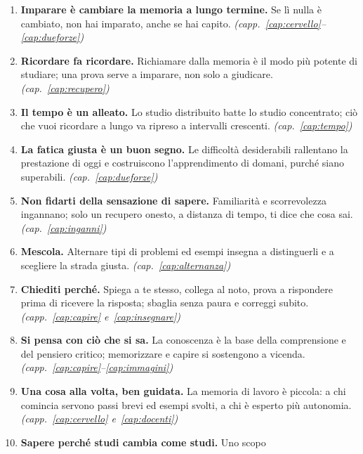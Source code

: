 \begin{enumerate}[leftmargin=1.8em, itemsep=0.35\baselineskip]
  \item \textbf{Imparare è cambiare la memoria a lungo termine.} Se lì
        nulla è cambiato, non hai imparato, anche se hai capito.
        {\footnotesize\itshape (capp.~\ref{cap:cervello}--\ref{cap:dueforze})}
  \item \textbf{Ricordare fa ricordare.} Richiamare dalla memoria è il
        modo più potente di studiare; una prova serve a imparare, non
        solo a giudicare.
        {\footnotesize\itshape (cap.~\ref{cap:recupero})}
  \item \textbf{Il tempo è un alleato.} Lo studio distribuito batte lo
        studio concentrato; ciò che vuoi ricordare a lungo va ripreso a
        intervalli crescenti.
        {\footnotesize\itshape (cap.~\ref{cap:tempo})}
  \item \textbf{La fatica giusta è un buon segno.} Le difficoltà
        desiderabili rallentano la prestazione di oggi e costruiscono
        l'apprendimento di domani, purché siano superabili.
        {\footnotesize\itshape (cap.~\ref{cap:dueforze})}
  \item \textbf{Non fidarti della sensazione di sapere.} Familiarità e
        scorrevolezza ingannano; solo un recupero onesto, a distanza di
        tempo, ti dice che cosa sai.
        {\footnotesize\itshape (cap.~\ref{cap:inganni})}
  \item \textbf{Mescola.} Alternare tipi di problemi ed esempi insegna
        a distinguerli e a scegliere la strada giusta.
        {\footnotesize\itshape (cap.~\ref{cap:alternanza})}
  \item \textbf{Chiediti perché.} Spiega a te stesso, collega al noto,
        prova a rispondere prima di ricevere la risposta; sbaglia senza
        paura e correggi subito.
        {\footnotesize\itshape (capp.~\ref{cap:capire} e~\ref{cap:insegnare})}
  \item \textbf{Si pensa con ciò che si sa.} La conoscenza è la base
        della comprensione e del pensiero critico; memorizzare e capire
        si sostengono a vicenda.
        {\footnotesize\itshape (capp.~\ref{cap:capire}--\ref{cap:immagini})}
  \item \textbf{Una cosa alla volta, ben guidata.} La memoria di lavoro
        è piccola: a chi comincia servono passi brevi ed esempi svolti,
        a chi è esperto più autonomia.
        {\footnotesize\itshape (capp.~\ref{cap:cervello} e~\ref{cap:docenti})}
  \item \textbf{Sapere perché studi cambia come studi.} Uno scopo

\end{enumerate}

